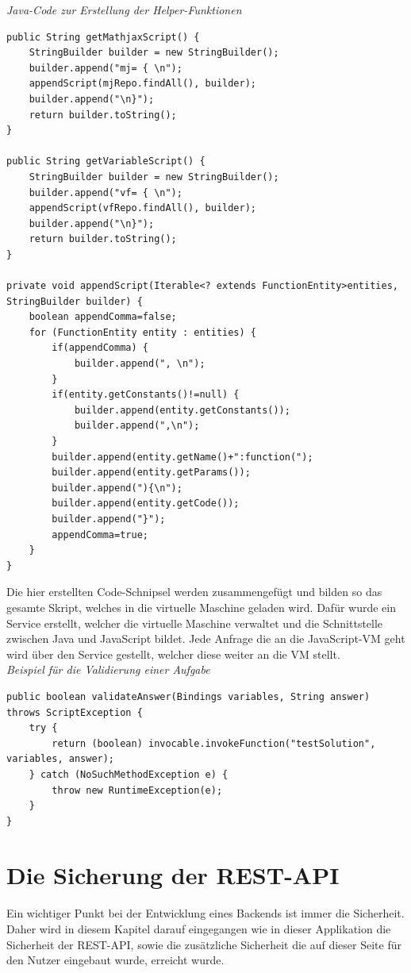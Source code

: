 \emph{Java-Code zur Erstellung der Helper-Funktionen}
\begin{lstlisting}
public String getMathjaxScript() {
	StringBuilder builder = new StringBuilder();
	builder.append("mj= { \n");
	appendScript(mjRepo.findAll(), builder);
	builder.append("\n}");
	return builder.toString();
}

public String getVariableScript() {
	StringBuilder builder = new StringBuilder();
	builder.append("vf= { \n");
	appendScript(vfRepo.findAll(), builder);
	builder.append("\n}");
	return builder.toString();
}

private void appendScript(Iterable<? extends FunctionEntity>entities, StringBuilder builder) {
	boolean appendComma=false;
	for (FunctionEntity entity : entities) {
		if(appendComma) {
			builder.append(", \n");
		}
		if(entity.getConstants()!=null) {
			builder.append(entity.getConstants());
			builder.append(",\n");
		}
		builder.append(entity.getName()+":function(");
		builder.append(entity.getParams());
		builder.append("){\n");
		builder.append(entity.getCode());
		builder.append("}");
		appendComma=true;
	}
}

\end{lstlisting}

Die hier erstellten Code-Schnipsel werden zusammengefügt und bilden so das gesamte Skript, welches in die virtuelle Maschine geladen wird. Dafür wurde ein Service erstellt, welcher die virtuelle Maschine verwaltet und die Schnittstelle zwischen Java und JavaScript bildet. Jede Anfrage die an die JavaScript-VM geht wird über den Service gestellt, welcher diese weiter an die VM stellt.\\

\emph{Beispiel für die Validierung einer Aufgabe}
\begin{lstlisting}
public boolean validateAnswer(Bindings variables, String answer) throws ScriptException {
	try {
		return (boolean) invocable.invokeFunction("testSolution", variables, answer);
	} catch (NoSuchMethodException e) {
		throw new RuntimeException(e);
	}
}
\end{lstlisting}

\section{Die Sicherung der REST-API}

Ein wichtiger Punkt bei der Entwicklung eines Backends ist immer die Sicherheit. Daher wird in diesem Kapitel darauf eingegangen wie in dieser Applikation die Sicherheit der REST-API, sowie die zusätzliche Sicherheit die auf dieser Seite für den Nutzer eingebaut wurde, erreicht wurde. \\


